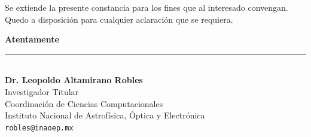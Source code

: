 \documentclass[11pt,letterpaper]{article}
\begin{document}
\vspace{0.4cm}

\noindent
Se extiende la presente constancia para los fines que al interesado convengan. Quedo a disposición para cualquier aclaración que se requiera.

\vspace{1cm}

\begin{center}
\textbf{Atentamente}

\vspace{1.2cm}

\rule{8cm}{0.4pt}\\[0.2cm]
\textbf{Dr. Leopoldo Altamirano Robles}\\
Investigador Titular\\
Coordinación de Ciencias Computacionales\\
Instituto Nacional de Astrofísica, Óptica y Electrónica\\[0.2cm]
\texttt{robles@inaoep.mx}
\end{center}
\end{document}
